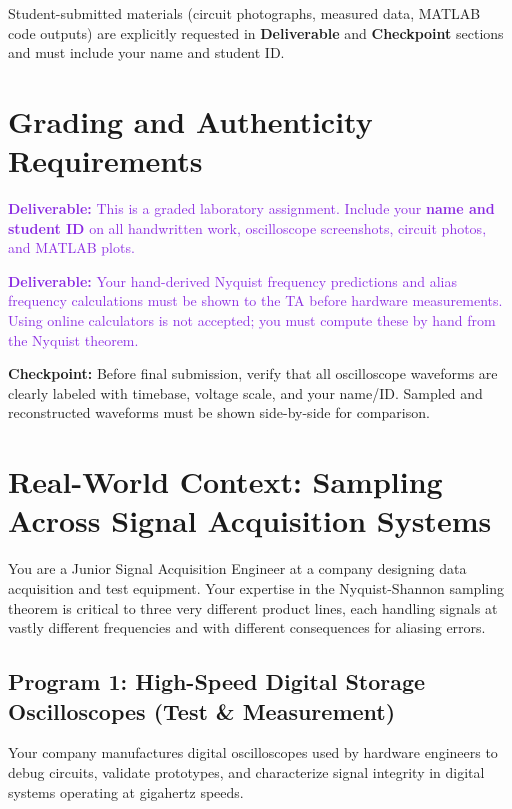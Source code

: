 \documentclass[11pt,letterpaper]{article}
\providecommand{\cpECE}[1]{\textcolor{OliveGreen}{\textbf{Checkpoint:} #1}}
\providecommand{\delECE}[1]{\textcolor{BlueViolet}{\textbf{Deliverable:} #1}}
\begin{document}
\noindent Student-submitted materials (circuit photographs, measured data, MATLAB code outputs) are explicitly requested in \textbf{Deliverable} and \textbf{Checkpoint} sections and must include your name and student ID.

\clearpage

\section*{Grading and Authenticity Requirements}
\delECE{This is a graded laboratory assignment. Include your \textbf{name and student ID} on all handwritten work, oscilloscope screenshots, circuit photos, and MATLAB plots.}

\delECE{Your hand-derived Nyquist frequency predictions and alias frequency calculations must be shown to the TA before hardware measurements. Using online calculators is not accepted; you must compute these by hand from the Nyquist theorem.}

\cpECE{Before final submission, verify that all oscilloscope waveforms are clearly labeled with timebase, voltage scale, and your name/ID. Sampled and reconstructed waveforms must be shown side-by-side for comparison.}

\clearpage

\section{Real-World Context: Sampling Across Signal Acquisition Systems}

\noindent
You are a Junior Signal Acquisition Engineer at a company designing data acquisition and test equipment. Your expertise in the Nyquist-Shannon sampling theorem is critical to three very different product lines, each handling signals at vastly different frequencies and with different consequences for aliasing errors.

\subsection{Program 1: High-Speed Digital Storage Oscilloscopes (Test \& Measurement)}

Your company manufactures digital oscilloscopes used by hardware engineers to debug circuits, validate prototypes, and characterize signal integrity in digital systems operating at gigahertz speeds.
\end{document}
